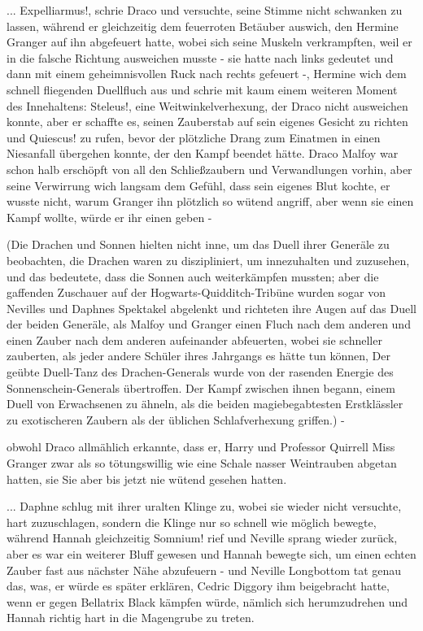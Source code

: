 ... \glqq Expelliarmus!\grqq{}, schrie Draco und versuchte, seine Stimme nicht
schwanken zu lassen, während er gleichzeitig dem feuerroten Betäuber auswich,
den Hermine Granger auf ihn abgefeuert hatte, wobei sich seine Muskeln
verkrampften, weil er in die falsche Richtung ausweichen musste - sie hatte nach
links gedeutet und dann mit einem geheimnisvollen Ruck nach rechts gefeuert -,
Hermine wich dem schnell fliegenden Duellfluch aus und schrie mit kaum einem
weiteren Moment des Innehaltens: \glqq Steleus!\grqq{}, eine
Weitwinkelverhexung, der Draco nicht ausweichen konnte, aber er schaffte es,
seinen Zauberstab auf sein eigenes Gesicht zu richten und \glqq Quiescus!\grqq{}
zu rufen, bevor der plötzliche Drang zum Einatmen in einen Niesanfall übergehen
konnte, der den Kampf beendet hätte. Draco Malfoy war schon halb erschöpft von
all den Schließzaubern und Verwandlungen vorhin, aber seine Verwirrung wich
langsam dem Gefühl, dass sein eigenes Blut kochte, er wusste nicht, warum
Granger ihn plötzlich so wütend angriff, aber wenn sie einen Kampf wollte, würde
er ihr einen geben -

(Die Drachen und Sonnen hielten nicht inne, um das Duell ihrer Generäle zu
beobachten, die Drachen waren zu diszipliniert, um innezuhalten und zuzusehen,
und das bedeutete, dass die Sonnen auch weiterkämpfen mussten; aber die
gaffenden Zuschauer auf der Hogwarts-Quidditch-Tribüne wurden sogar von Nevilles
und Daphnes Spektakel abgelenkt und richteten ihre Augen auf das Duell der
beiden Generäle, als Malfoy und Granger einen Fluch nach dem anderen und einen
Zauber nach dem anderen aufeinander abfeuerten, wobei sie schneller zauberten,
als jeder andere Schüler ihres Jahrgangs es hätte tun können, Der geübte
Duell-Tanz des Drachen-Generals wurde von der rasenden Energie des
Sonnenschein-Generals übertroffen. Der Kampf zwischen ihnen begann, einem Duell
von Erwachsenen zu ähneln, als die beiden magiebegabtesten Erstklässler zu
exotischeren Zaubern als der üblichen Schlafverhexung griffen.) -

obwohl Draco allmählich erkannte, dass er, Harry und Professor Quirrell Miss
Granger zwar als so tötungswillig wie eine Schale nasser Weintrauben abgetan
hatten, sie Sie aber bis jetzt nie wütend gesehen hatten.

... Daphne schlug mit ihrer uralten Klinge zu, wobei sie wieder nicht versuchte,
hart zuzuschlagen, sondern die Klinge nur so schnell wie möglich bewegte,
während Hannah gleichzeitig \glqq Somnium!\grqq{} rief und Neville sprang wieder
zurück, aber es war ein weiterer Bluff gewesen und Hannah bewegte sich, um einen
echten Zauber fast aus nächster Nähe abzufeuern - und Neville Longbottom tat
genau das, was, er würde es später erklären, Cedric Diggory ihm beigebracht
hatte, wenn er gegen Bellatrix Black kämpfen würde, nämlich sich herumzudrehen
und Hannah richtig hart in die Magengrube zu treten.

